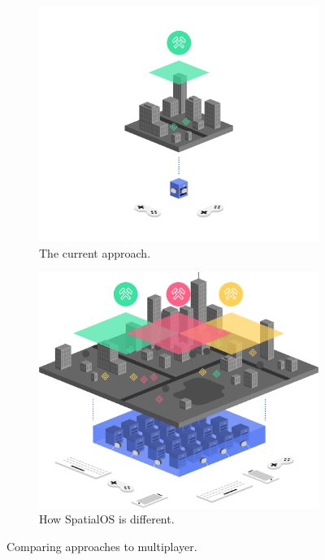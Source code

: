 \documentclass[a4paper,11pt,titlepage]{report}
\begin{document}
\begin{figure}[!hbpt]
\centering
\begin{subfigure}{.5\textwidth}
  \centering
  \includegraphics[width=\linewidth]{img/spatialos-diagram_current2.png}
  \caption{The current approach.}
  \label{fig:spatialos-diagram_current2}
\end{subfigure}%
\begin{subfigure}{.5\textwidth}
  \centering
  \includegraphics[width=\linewidth]{img/spatialos-diagram_solution2.png}
  \caption{How SpatialOS is different.}
  \label{fig:spatialos-diagram_solution2}
\end{subfigure}
\caption{Comparing approaches to multiplayer. \cite{ImprobableWorldsLtd.2018b}}
\label{fig:test}
\end{figure}
\end{document}
